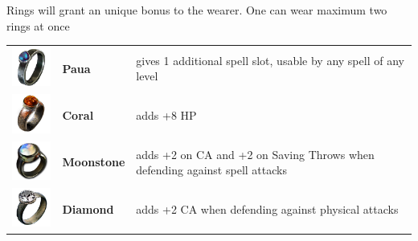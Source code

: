 Rings will grant an unique bonus to the wearer. One can wear maximum two rings at once \\

\begin{tabular}{m{2cm}m{3cm}m{5cm} } 
	\includegraphics[width=2cm]{../Pictures/Gameplay/Items/Wearables/Rings/Paua_ring_icon.png} & \textbf{Paua} & gives 1 additional spell slot, usable by any spell of any level \\ 
	\includegraphics[width=2cm]{../Pictures/Gameplay/Items/Wearables/Rings/Coral_ring_icon.png} & \textbf{Coral} & adds +8 HP \\ 
	\includegraphics[width=2cm]{../Pictures/Gameplay/Items/Wearables/Rings/Moonstone_ring_icon.png} & \textbf{Moonstone} & adds +2 on CA and +2 on Saving Throws when defending against spell attacks \\ 
	\includegraphics[width=2cm]{../Pictures/Gameplay/Items/Wearables/Rings/Diamond_ring_icon.png} & \textbf{Diamond} & adds +2 CA when defending against physical attacks \\ 
\end{tabular}

\pagebreak 